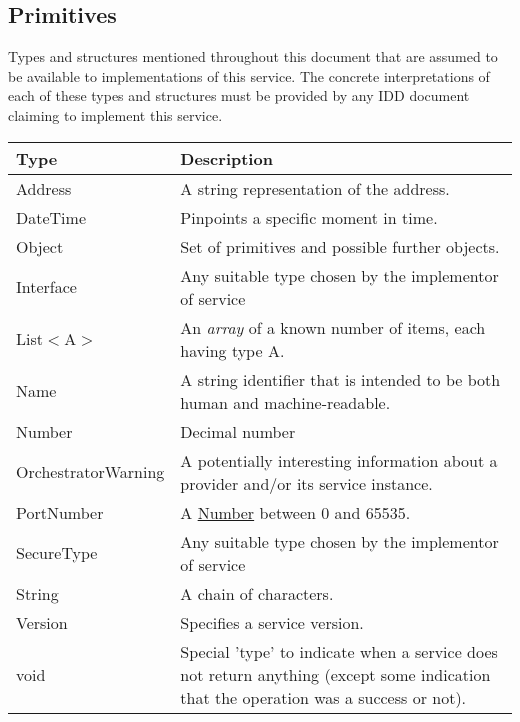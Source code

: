 \documentclass[a4paper]{arrowhead}
\newcommand{\pdef}[1]{{\textcolor{ArrowheadGrey}{#1\label{sec:model:primitives:#1}\label{sec:model:primitives:#1s}\label{sec:model:primitives:#1es}}}}
\newcommand{\pref}[1]{{\textcolor{ArrowheadGrey}{\hyperref[sec:model:primitives:#1]{#1}}}}
\begin{document}
\clearpage

\subsection{Primitives}
\label{sec:model:primitives}

Types and structures mentioned throughout this document that are assumed to be available to implementations of this service.
The concrete interpretations of each of these types and structures must be provided by any IDD document claiming to implement this service.


\begin{table}[ht!]
\begin{tabularx}{\textwidth}{| p{4cm} | X |} \hline
\rowcolor{gray!33} Type & Description \\ \hline
\pdef{Address}          & A string representation of the address. \\ \hline
\pdef{DateTime}         & Pinpoints a specific moment in time. \\ \hline
\pdef{Object}           & Set of primitives and possible further objects. \\ \hline
\pdef{Interface}        & Any suitable type chosen by the implementor of service \\ \hline
\pdef{List}$<$A$>$      & An \textit{array} of a known number of items, each having type A. \\ \hline
\pdef{Name}             & A string identifier that is intended to be both human and machine-readable. \\ \hline
\pdef{Number}           & Decimal number \\ \hline
\pdef{OrchestratorWarning} & A potentially interesting information about a provider and/or its service instance. \\ \hline
\pdef{PortNumber}       & A \pref{Number} between 0 and 65535. \\ \hline
\pdef{SecureType}       & Any suitable type chosen by the implementor of service \\ \hline
\pdef{String}           & A chain of characters. \\ \hline
\pdef{Version}          & Specifies a service version. \\ \hline
\pdef{void}             & Special 'type' to indicate when a service does not return anything (except some indication that the operation was a success or not). \\ \hline 
\end{tabularx}
\end{table}
\end{document}
